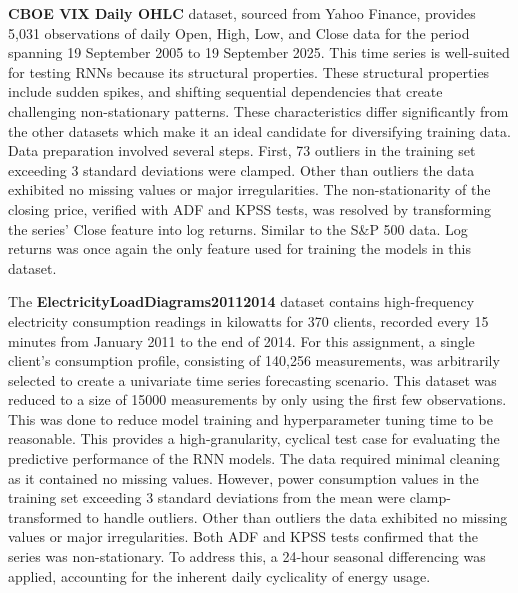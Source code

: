 \documentclass[conference, 10pt]{IEEEtran}
\begin{document}
\textbf{CBOE VIX Daily OHLC} dataset, sourced from Yahoo Finance, provides 5,031 observations of daily Open, High, Low,
and Close data for the period spanning 19 September 2005 to 19 September 2025. This time series is well-suited for
testing RNNs because its structural properties. These structural properties include sudden spikes, and shifting
sequential dependencies that create challenging non-stationary patterns. These characteristics differ significantly from
the other datasets which make it an ideal candidate for diversifying training data. Data preparation involved several
steps. First, 73 outliers in the training set exceeding 3 standard deviations were clamped. Other than outliers the data
exhibited no missing values or major irregularities. The non-stationarity of the closing price, verified with ADF and
KPSS tests, was resolved by transforming the series' Close feature into log returns. Similar to the S\&P 500 data. Log
returns was once again the only feature used for training the models in this dataset.

The \textbf{ElectricityLoadDiagrams20112014} dataset contains high-frequency electricity consumption readings in
kilowatts for 370 clients, recorded every 15 minutes from January 2011 to the end of 2014. For this assignment, a single
client's consumption profile, consisting of 140,256 measurements, was arbitrarily selected to create a univariate time
series forecasting scenario. This dataset was reduced to a size of 15000 measurements by only using the first few
observations. This was done to reduce model training and hyperparameter tuning time to be reasonable. This provides a
high-granularity, cyclical test case for evaluating the predictive performance of the RNN models. The data required
minimal cleaning as it contained no missing values. However, power consumption values in the training set exceeding 3
standard deviations from the mean were clamp-transformed to handle outliers. Other than outliers the data exhibited no
missing values or major irregularities. Both ADF and KPSS tests confirmed that the series was non-stationary. To address
this, a 24-hour seasonal differencing was applied, accounting for the inherent daily cyclicality of energy usage.
\end{document}
